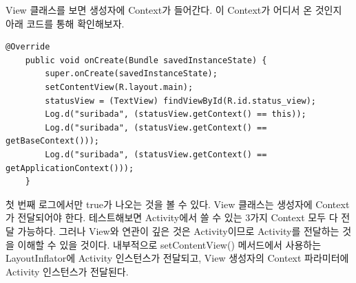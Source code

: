View 클래스를 보면 생성자에 Context가 들어간다. 이 Context가 어디서 온 것인지 아래 코드를 통해 확인해보자.
\begin{lstlisting}[frame=single]
    @Override
    public void onCreate(Bundle savedInstanceState) {
        super.onCreate(savedInstanceState);
        setContentView(R.layout.main);
        statusView = (TextView) findViewById(R.id.status_view);
        Log.d("suribada", (statusView.getContext() == this));
        Log.d("suribada", (statusView.getContext() == getBaseContext()));
        Log.d("suribada", (statusView.getContext() == getApplicationContext()));
    }
\end{lstlisting}
첫 번째 로그에서만 true가 나오는 것을 볼 수 있다. View 클래스는 생성자에 Context가 전달되어야 한다. 테스트해보면 Activity에서 쓸 수 있는 3가지 Context 모두 다 전달 가능하다. 그러나 View와 연관이 깊은 것은 Activity이므로 Activity를 전달하는 것을 이해할 수 있을 것이다.
내부적으로 setContentView() 메서드에서 사용하는 LayoutInflator에 Activity 인스턴스가 전달되고, View 생성자의 Context 파라미터에 Activity 인스턴스가 전달된다. 
